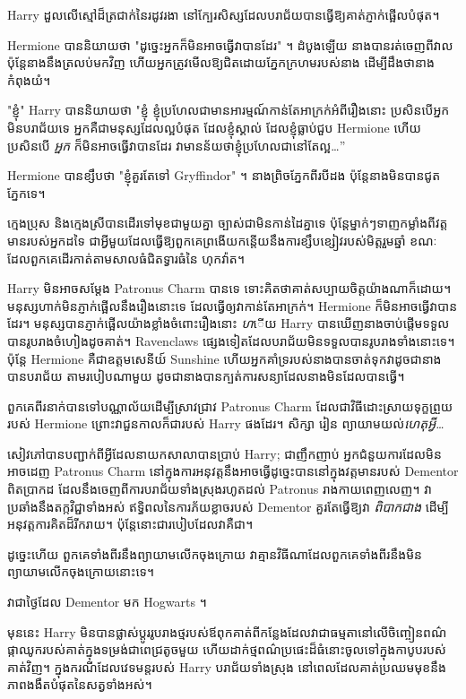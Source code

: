 Harry ដួលលើស្មៅដ៏ត្រជាក់នៃរដូវរងា នៅក្បែរសិស្សដែលបរាជ័យបានធ្វើឱ្យគាត់ភ្ញាក់ផ្អើលបំផុត។

Hermione បាននិយាយថា "ដូច្នេះអ្នកក៏មិនអាចធ្វើវាបានដែរ" ។ ដំបូងឡើយ នាងបានរត់ចេញពីវាល ប៉ុន្តែនាងនឹងត្រលប់មកវិញ ហើយអ្នកត្រូវមើលឱ្យជិតដោយភ្នែកក្រហមរបស់នាង ដើម្បីដឹងថានាងកំពុងយំ។

"ខ្ញុំ" Harry បាននិយាយថា "ខ្ញុំ ខ្ញុំប្រហែលជាមានអារម្មណ៍កាន់តែអាក្រក់អំពីរឿងនោះ ប្រសិនបើអ្នកមិនបរាជ័យទេ អ្នកគឺជាមនុស្សដែលល្អបំផុត ដែលខ្ញុំស្គាល់ ដែលខ្ញុំធ្លាប់ជួប Hermione ហើយប្រសិនបើ \emph{អ្នក} ក៏មិនអាចធ្វើវាបានដែរ វាមានន័យថាខ្ញុំប្រហែលជានៅតែល្អ…”

Hermione បានខ្សឹបថា "ខ្ញុំគួរតែទៅ Gryffindor" ។ នាង​ព្រិច​ភ្នែក​ពីរ​បី​ដង ប៉ុន្តែ​នាង​មិន​បាន​ជូត​ភ្នែក​ទេ។

\later

ក្មេងប្រុស និងក្មេងស្រីបានដើរទៅមុខជាមួយគ្នា ច្បាស់ជាមិនកាន់ដៃគ្នាទេ ប៉ុន្តែម្នាក់ៗទាញកម្លាំងពីវត្តមានរបស់អ្នកដទៃ ជាអ្វីមួយដែលធ្វើឱ្យពួកគេព្រងើយកន្តើយនឹងការខ្សឹបខ្សៀវរបស់មិត្តរួមឆ្នាំ ខណៈដែលពួកគេដើរកាត់តាមសាលធំជិតទ្វារធំនៃ ហុកវ៉ាត។

Harry មិនអាចសម្ដែង Patronus Charm បានទេ ទោះគិតថាគាត់សប្បាយចិត្តយ៉ាងណាក៏ដោយ។ មនុស្ស​ហាក់​មិន​ភ្ញាក់​ផ្អើល​នឹង​រឿង​នោះ​ទេ ដែល​ធ្វើ​ឲ្យ​វា​កាន់​តែ​អាក្រក់។ Hermione ក៏​មិន​អាច​ធ្វើ​វា​បាន​ដែរ។ មនុស្សបានភ្ញាក់ផ្អើលយ៉ាងខ្លាំងចំពោះរឿងនោះ \emph ហើយ Harry បានឃើញនាងចាប់ផ្តើមទទួលបានរូបរាងចំហៀងដូចគាត់។ Ravenclaws ផ្សេងទៀតដែលបរាជ័យមិនទទួលបានរូបរាងទាំងនោះទេ។ ប៉ុន្តែ Hermione គឺជាឧត្តមសេនីយ៍ Sunshine ហើយអ្នកគាំទ្ររបស់នាងបានចាត់ទុកវាដូចជានាងបានបរាជ័យ តាមរបៀបណាមួយ ដូចជានាងបានក្បត់ការសន្យាដែលនាងមិនដែលបានធ្វើ។

ពួកគេពីរនាក់បានទៅបណ្ណាល័យដើម្បីស្រាវជ្រាវ Patronus Charm ដែលជាវិធីដោះស្រាយទុក្ខព្រួយរបស់ Hermione ព្រោះវាជួនកាលក៏ជារបស់ Harry ផងដែរ។ សិក្សា រៀន ព្យាយាមយល់\emph{ហេតុអ្វី…}

សៀវភៅបានបញ្ជាក់ពីអ្វីដែលនាយកសាលាបានប្រាប់ Harry; ជាញឹកញាប់ អ្នកជំនួយការដែលមិនអាចដេញ Patronus Charm នៅក្នុងការអនុវត្តនឹងអាចធ្វើដូច្នេះបាននៅក្នុងវត្តមានរបស់ Dementor ពិតប្រាកដ ដែលនឹងចេញពីការបរាជ័យទាំងស្រុងរហូតដល់ Patronus រាងកាយពេញលេញ។ វាប្រឆាំងនឹងតក្កវិជ្ជាទាំងអស់ ឥទ្ធិពលនៃការភ័យខ្លាចរបស់ Dementor គួរតែធ្វើឱ្យវា \emph{ពិបាកជាង} ដើម្បីអនុវត្តការគិតដ៏រីករាយ។ ប៉ុន្តែនោះជារបៀបដែលវាគឺជា។

ដូច្នេះហើយ ពួកគេទាំងពីរនឹងព្យាយាមលើកចុងក្រោយ វាគ្មានវិធីណាដែលពួកគេទាំងពីរនឹងមិនព្យាយាមលើកចុងក្រោយនោះទេ។

វាជាថ្ងៃដែល Dementor មក Hogwarts ។

មុននេះ Harry មិនបានផ្លាស់ប្តូររូបរាងថ្មរបស់ឪពុកគាត់ពីកន្លែងដែលវាជាធម្មតានៅលើចិញ្ចៀនពណ៌ផ្កាឈូករបស់គាត់ក្នុងទម្រង់ជាពេជ្រតូចមួយ ហើយដាក់ថ្មពណ៌ប្រផេះដ៏ធំនោះចូលទៅក្នុងកាបូបរបស់គាត់វិញ។ ក្នុងករណីដែលវេទមន្តរបស់ Harry បរាជ័យទាំងស្រុង នៅពេលដែលគាត់ប្រឈមមុខនឹងភាពងងឹតបំផុតនៃសត្វទាំងអស់។

